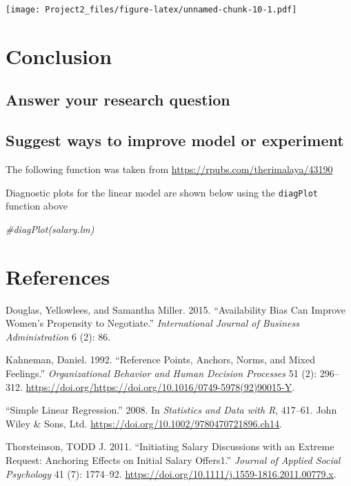 \documentclass[]{article}
\newenvironment{Shaded}{\begin{snugshade}}{\end{snugshade}}
\newcommand{\CommentTok}[1]{\textcolor[rgb]{0.56,0.35,0.01}{\textit{#1}}}
\begin{document}
\texttt{[image: Project2\_files/figure-latex/unnamed-chunk-10-1.pdf]}

\hypertarget{conclusion}{%
\section{Conclusion}\label{conclusion}}

\hypertarget{answer-your-research-question}{%
\subsection{Answer your research
question}\label{answer-your-research-question}}

\hypertarget{suggest-ways-to-improve-model-or-experiment}{%
\subsection{Suggest ways to improve model or
experiment}\label{suggest-ways-to-improve-model-or-experiment}}

The following function was taken from
\url{https://rpubs.com/therimalaya/43190}

Diagnostic plots for the linear model are shown below using the
\texttt{diagPlot} function above

\begin{Shaded}
\begin{Highlighting}[]
\CommentTok{#diagPlot(salary.lm)}
\end{Highlighting}
\end{Shaded}

\hypertarget{references}{%
\section*{References}\label{references}}

\hypertarget{refs}{}
\leavevmode\hypertarget{ref-douglas2015availability}{}%
Douglas, Yellowlees, and Samantha Miller. 2015. ``Availability Bias Can
Improve Women's Propensity to Negotiate.'' \emph{International Journal
of Business Administration} 6 (2): 86.

\leavevmode\hypertarget{ref-KAHNEMAN1992296}{}%
Kahneman, Daniel. 1992. ``Reference Points, Anchors, Norms, and Mixed
Feelings.'' \emph{Organizational Behavior and Human Decision Processes}
51 (2): 296--312.
\url{https://doi.org/https://doi.org/10.1016/0749-5978(92)90015-Y}.

\leavevmode\hypertarget{ref-ch14}{}%
``Simple Linear Regression.'' 2008. In \emph{Statistics and Data with
R}, 417--61. John Wiley \& Sons, Ltd.
\url{https://doi.org/10.1002/9780470721896.ch14}.

\leavevmode\hypertarget{ref-thorsteinson}{}%
Thorsteinson, TODD J. 2011. ``Initiating Salary Discussions with an
Extreme Request: Anchoring Effects on Initial Salary Offers1.''
\emph{Journal of Applied Social Psychology} 41 (7): 1774--92.
\url{https://doi.org/10.1111/j.1559-1816.2011.00779.x}.
\end{document}
